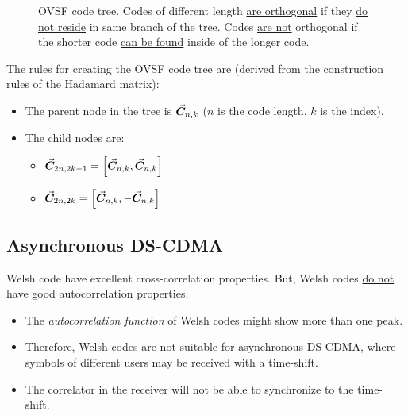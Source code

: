 \begin{refsection}
\begin{figure}[H]
	\caption[\acs{OVSF} code tree]{\acs{OVSF} code tree. Codes of different length \underline{are orthogonal} if they \underline{do not reside} in same branch of the tree. Codes \underline{are not} orthogonal if the shorter code \underline{can be found} inside of the longer code.}
	\label{fig:ch07:ovsf_code_tree}
\end{figure}

The rules for creating the \acs{OVSF} code tree are (derived from the construction rules of the Hadamard matrix):
\begin{itemize}
	\item The parent node in the tree is $\vec{\bm{C}}_{n,k}$ ($n$ is the code length, $k$ is the index).
	\item The child nodes are:
	\begin{itemize}
		\item $\vec{\bm{C}}_{2n,2k-1} = \left[\vec{\bm{C}}_{n,k}, \vec{\bm{C}}_{n,k}\right]$
		\item $\vec{\bm{C}}_{2n,2k} = \left[\vec{\bm{C}}_{n,k}, -\vec{\bm{C}}_{n,k}\right]$
	\end{itemize}
\end{itemize}

\subsection{Asynchronous \acs{DS-CDMA}}

Welsh code have excellent cross-correlation properties. But, Welsh codes \underline{do not} have good autocorrelation properties.
\begin{itemize}
	\item The \emph{autocorrelation function} of Welsh codes might show more than one peak.
	\item Therefore, Welsh codes \underline{are not} suitable for asynchronous \ac{DS-CDMA}, where symbols of different users may be received with a time-shift.
	\item The correlator in the receiver will not be able to synchronize to the time-shift.
\end{itemize}


\end{refsection}

